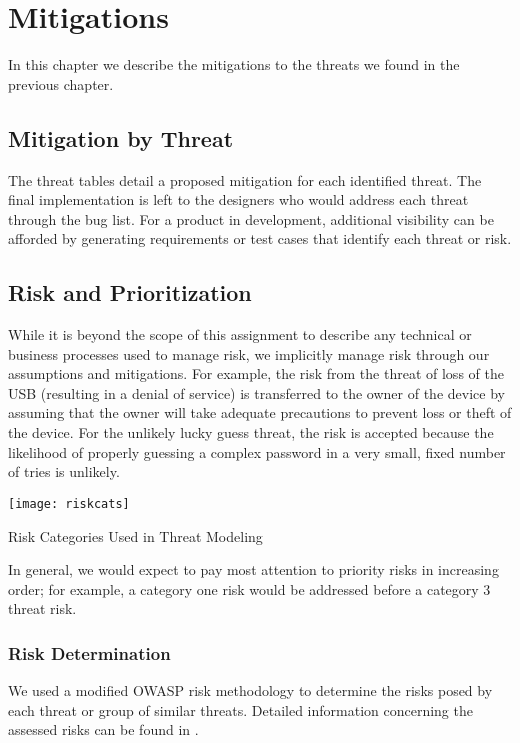 \chapter{Mitigations}
\label{ch:mitigations}
In this chapter we describe the mitigations to the threats we found in
the previous chapter.

\section{Mitigation by Threat}
The threat tables detail a proposed mitigation for each identified threat.  The final implementation is left to the designers who would address each threat through the bug list. For a product in development, additional visibility can be afforded by generating requirements or test cases that identify each threat or risk.

\section{Risk and Prioritization}
\label{sec:risk}
While it is beyond the scope of this assignment to describe any technical or
business processes used to manage risk, we implicitly manage risk through our
assumptions and mitigations.  For example, the risk from the threat of loss of
the USB (resulting in a denial of service) is transferred to the owner of the
device by assuming that the owner will take adequate precautions to prevent loss
or theft of the device.  For the unlikely lucky guess threat, the risk is
accepted because the likelihood of properly guessing a complex password in a
very small, fixed number of tries is unlikely.

\begin{marginfigure}
    \centering
    \texttt{[image: riskcats]}
    \caption{Risk Categories Used in Threat Modeling}
    \label{fig:riskcats}
\end{marginfigure}

In general, we would expect to pay most attention to priority risks in
increasing order; for example, a category one risk would be addressed before a
category 3 threat risk.

\subsection{Risk Determination}
We used a modified OWASP risk methodology to determine the risks posed by each
threat or group of similar threats. Detailed information concerning the assessed
risks can be found in .
